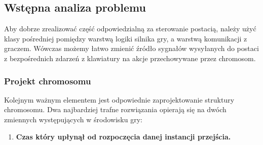 \subsection{Wstępna analiza problemu}
\begin{par}
	Aby dobrze zrealizować część odpowiedzialną za sterowanie postacią, należy użyć klasy pośredniej pomiędzy warstwą logiki silnika gry, a warstwą komunikacji z graczem. 
	Wówczas możemy łatwo zmienić źródło sygnałów wysyłanych do postaci z bezpośrednich zdarzeń z klawiatury na akcje przechowywane przez chromosom. 
	\subsubsection{Projekt chromosomu}
	Kolejnym ważnym elementem jest odpowiednie zaprojektowanie struktury chromosomu. 
	Dwa najbardziej trafne rozwiązania opierają się na dwóch zmiennych występujących w środowisku gry:
	\begin{enumerate}
	\item
	{\bf Czas który upłynął od rozpoczęcia danej instancji przejścia. }
	\begin{par}


\end{par}
\end{enumerate}
\end{par}

